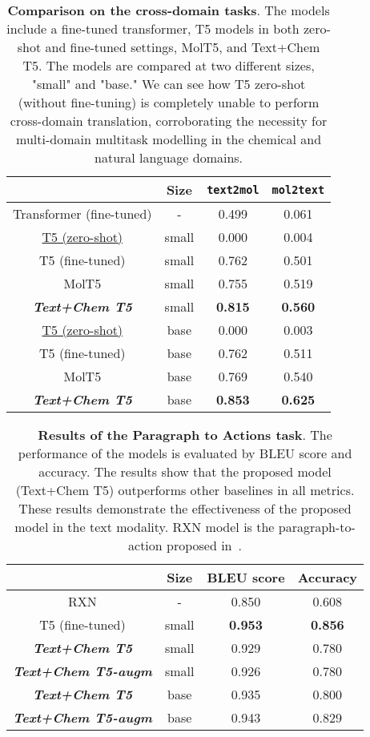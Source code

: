 \documentclass[nohyperref]{article}
\theoremstyle{plain}
\theoremstyle{definition}
\theoremstyle{remark}
\begin{document}
\begin{table}[ht]
    \centering
    \caption{\textbf{Comparison on the cross-domain tasks}. 
    The models include a fine-tuned transformer, T5 models in both zero-shot and fine-tuned settings, MolT5, and Text+Chem T5. The models are compared at two different sizes, "small" and "base." We can see how T5 zero-shot (without fine-tuning) is completely unable to perform cross-domain translation, corroborating the necessity for multi-domain multitask modelling in the chemical and natural language domains.
    }
    \begin{tabular}{c c | cc}
    \toprule
    & Size & \texttt{text2mol} & \texttt{mol2text} \\
    \midrule
    Transformer (fine-tuned) & - & 0.499 & 0.061  \\
    \underline{T5 (zero-shot)}    & small & 0.000  & 0.004 \\
    T5 (fine-tuned)    & small & 0.762  & 0.501 \\
    MolT5             & small & 0.755 & 0.519  \\
    \textbf{\emph{Text+Chem T5}} & small & \textbf{0.815} & \textbf{0.560} \\
    \midrule
    \underline{T5 (zero-shot)}    & base & 0.000  & 0.003 \\
    T5 (fine-tuned)    & base & 0.762  & 0.511 \\
    MolT5             & base & 0.769 & 0.540  \\
    \textbf{\emph{Text+Chem T5}} & base & \textbf{0.853} & \textbf{0.625} \\
    \bottomrule
    \end{tabular}
    \label{tab:experiments-appendix}
\end{table}

\begin{table}[ht]
    \centering
    \caption{\textbf{Results of the Paragraph to Actions task}. 
    The performance of the models is evaluated by BLEU score and accuracy. The results show that the proposed model (Text+Chem T5) outperforms other baselines in all metrics. These results demonstrate the effectiveness of the proposed model in the text modality. RXN model is the paragraph-to-action proposed in~\citep{vaucher2020automated}.
    }
    \begin{tabular}{cc | cc}
    \toprule
     & Size & BLEU score  &Accuracy  \\
    \midrule
    RXN & - & 0.850 & 0.608\\
    T5 (fine-tuned) & small & \textbf{0.953} & \textbf{0.856} \\
    \textbf{\emph{Text+Chem T5}} & small &0.929&0.780 \\
    \textbf{\emph{Text+Chem T5-augm}} & small & 0.926&0.780 \\
    \midrule
    \textbf{\emph{Text+Chem T5}} & base & 0.935 & 0.800  \\
    \textbf{\emph{Text+Chem T5-augm}} & base & 0.943 & 0.829  \\
    \bottomrule
    \end{tabular}
    \label{tab:experiments-paragraph-to-actions}
\end{table}
\end{document}
